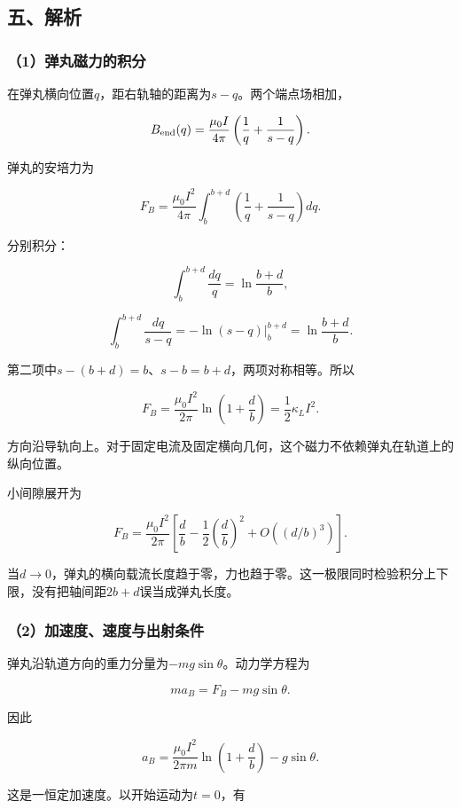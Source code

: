 \documentclass[12pt,a4paper,fontset=fandol]{ctexart}
\begin{document}
\subsection{五、解析}\label{ux4e94ux89e3ux6790-2}

\subsubsection{（1）弹丸磁力的积分}\label{ux5f39ux4e38ux78c1ux529bux7684ux79efux5206}

在弹丸横向位置\(q\)，距右轨轴的距离为\(s-q\)。两个端点场相加，

\[
B_{\rm end}(q)=\frac{\mu_0I}{4\pi}
\left(\frac1q+\frac1{s-q}\right).
\]

弹丸的安培力为

\[
F_B=\frac{\mu_0I^2}{4\pi}
\int_b^{b+d}
\left(\frac1q+\frac1{s-q}\right)dq.
\]

分别积分：

\[
\int_b^{b+d}\frac{dq}{q}
=\ln\frac{b+d}{b},
\]

\[
\int_b^{b+d}\frac{dq}{s-q}
=-\ln(s-q)\bigg|_b^{b+d}
=\ln\frac{b+d}{b}.
\]

第二项中\(s-(b+d)=b\)、\(s-b=b+d\)，两项对称相等。所以

\[
\boxed{
F_B=\frac{\mu_0I^2}{2\pi}
\ln\left(1+\frac db\right)
=\frac12\kappa_LI^2}.
\]

方向沿导轨向上。对于固定电流及固定横向几何，这个磁力不依赖弹丸在轨道上的纵向位置。

小间隙展开为

\[
F_B=\frac{\mu_0I^2}{2\pi}
\left[\frac db-\frac12\left(\frac db\right)^2
+O\left((d/b)^3\right)\right].
\]

当\(d\to0\)，弹丸的横向载流长度趋于零，力也趋于零。这一极限同时检验积分上下限，没有把轴间距\(2b+d\)误当成弹丸长度。

\subsubsection{（2）加速度、速度与出射条件}\label{ux52a0ux901fux5ea6ux901fux5ea6ux4e0eux51faux5c04ux6761ux4ef6}

弹丸沿轨道方向的重力分量为\(-mg\sin\theta\)。动力学方程为

\[
ma_B=F_B-mg\sin\theta.
\]

因此

\[
\boxed{
a_B=\frac{\mu_0I^2}{2\pi m}
\ln\left(1+\frac db\right)-g\sin\theta}.
\]

这是一恒定加速度。以开始运动为\(t=0\)，有
\end{document}
